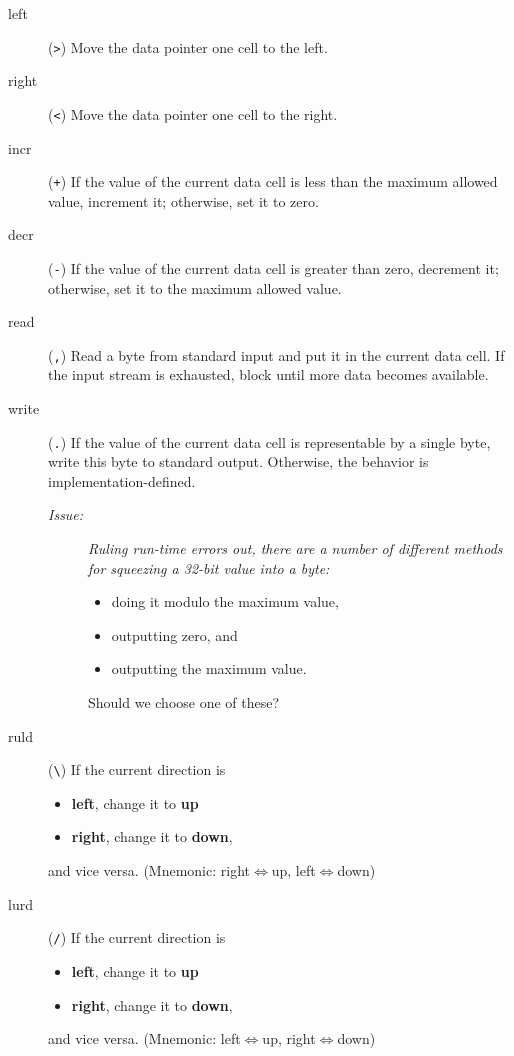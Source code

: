 \documentclass[a4paper]{article}
\newcommand\comment[2]{\begin{description} \item[#1] #2 \end{description}}
\newcommand\issue[1]{{\comment{\textit{Issue:}}{\it #1}}}
\begin{document}
\begin{description}

\item[left] (\verb">") Move the data pointer one cell to the left.

\item[right] (\verb"<") Move the data pointer one cell to the right.

\item[incr] (\verb"+") If the value of the current data cell is less than the
maximum allowed value, increment it; otherwise, set it to zero.

\item[decr] (\verb"-") If the value of the current data cell is greater than
zero, decrement it; otherwise, set it to the maximum allowed value.

\item[read] (\verb",") Read a byte from standard input and put it in the
current data cell.  If the input stream is exhausted, block until more data
becomes available.

\item[write] (\verb".") If the value of the current data cell is
representable by a single byte, write this byte to standard output.
Otherwise, the behavior is implementation-defined.

\issue{Ruling run-time errors out, there are a number of different methods for
squeezing a 32-bit value into a byte: \begin{itemize} \item doing it modulo
the maximum value, \item outputting zero, and \item outputting the maximum
value. \end{itemize}  Should we choose one of these?}

\item[ruld] (\verb"\") If the current direction is \begin{itemize} \item
\textbf{left}, change it to \textbf{up} \item \textbf{right}, change it to
\textbf{down}, \end{itemize} and vice versa. (Mnemonic:
right$\Longleftrightarrow$up, left$\Longleftrightarrow$down)

\item[lurd] (\verb"/") If the current direction is \begin{itemize} \item
\textbf{left}, change it to \textbf{up} \item \textbf{right}, change it to
\textbf{down}, \end{itemize} and vice versa.  (Mnemonic:
left$\Longleftrightarrow$up, right$\Longleftrightarrow$down)


\end{description}
\end{document}
